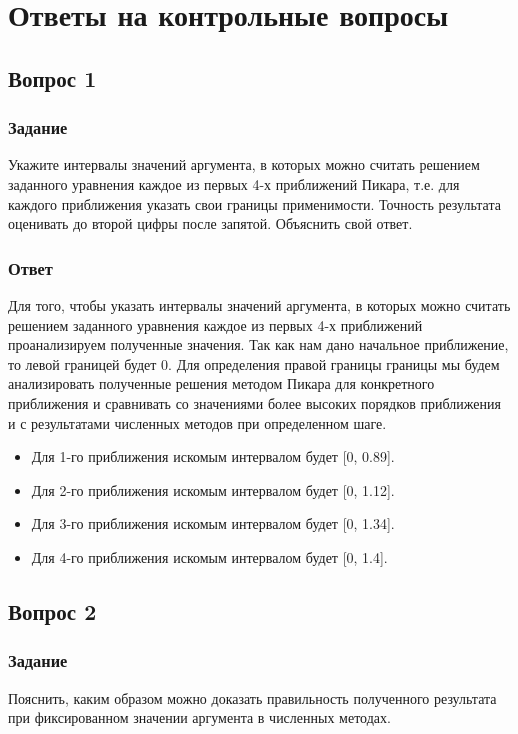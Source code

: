 \documentclass[a4paper,14pt, unknownkeysallowed]{extreport}
\begin{document}
\chapter{Ответы на контрольные вопросы}

\section{Вопрос 1}

\subsection{Задание}
Укажите интервалы значений аргумента, в которых можно считать решением заданного уравнения каждое из первых 4-х приближений Пикара, т.е. для каждого приближения указать свои границы применимости. Точность результата оценивать до второй цифры после запятой. Объяснить свой ответ.

\subsection{Ответ}
Для того, чтобы указать интервалы значений аргумента, в которых можно считать решением заданного уравнения каждое из первых 4-х приближений проанализируем полученные значения. Так как нам дано начальное приближение, то левой границей будет 0. Для определения правой границы границы мы будем анализировать полученные решения методом Пикара для конкретного приближения и сравнивать со значениями более высоких порядков приближения и с результатами численных методов при определенном шаге.

\begin{itemize}
	\item Для 1-го приближения искомым интервалом будет [0, 0.89].
	\item Для 2-го приближения искомым интервалом будет [0, 1.12].
	\item Для 3-го приближения искомым интервалом будет [0, 1.34].
	\item Для 4-го приближения искомым интервалом будет [0, 1.4].
\end{itemize}

\section{Вопрос 2}

\subsection{Задание}
Пояснить, каким образом можно доказать правильность полученного результата при фиксированном значении аргумента в численных методах.
\end{document}
